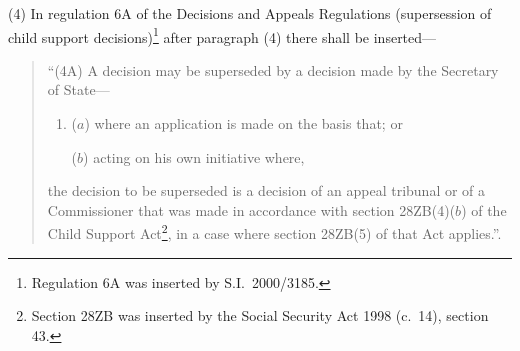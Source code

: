 \documentclass[12pt,a4paper]{article}
\begin{document}
(4) In regulation 6A of the Decisions and Appeals Regulations (supersession of child support decisions)\footnote{Regulation 6A was inserted by S.I.\ 2000/3185.} after paragraph (4) there shall be inserted—
\begin{quotation}
“(4A) A decision may be superseded by a decision made by the Secretary of State—
\begin{enumerate}\item[]
($a$) where an application is made on the basis that; or

($b$) acting on his own initiative where,
\end{enumerate}
the decision to be superseded is a decision of an appeal tribunal or of a Commissioner that was made in accordance with section 28ZB(4)($b$)  of the Child Support Act\footnote{Section 28ZB was inserted by the Social Security Act 1998 (c.\ 14), section 43.}, in a case where section 28ZB(5) of that Act applies.”.
\end{quotation}
\end{document}
